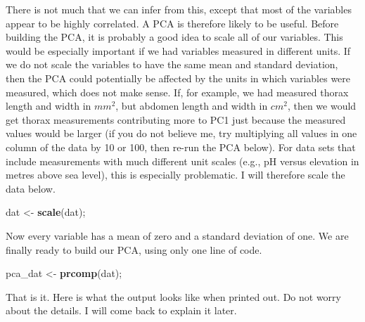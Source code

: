 \documentclass[]{article}
\newenvironment{Shaded}{\begin{snugshade}}{\end{snugshade}}
\newcommand{\KeywordTok}[1]{\textcolor[rgb]{0.13,0.29,0.53}{\textbf{#1}}}
\newcommand{\NormalTok}[1]{#1}
\newcommand{\StringTok}[1]{\textcolor[rgb]{0.31,0.60,0.02}{#1}}
\begin{document}
There is not much that we can infer from this, except that most of the
variables appear to be highly correlated. A PCA is therefore likely to
be useful. Before building the PCA, it is probably a good idea to scale
all of our variables. This would be especially important if we had
variables measured in different units. If we do not scale the variables
to have the same mean and standard deviation, then the PCA could
potentially be affected by the units in which variables were measured,
which does not make sense. If, for example, we had measured thorax
length and width in \(mm^2\), but abdomen length and width in
\(cm^{2}\), then we would get thorax measurements contributing more to
PC1 just because the measured values would be larger (if you do not
believe me, try multiplying all values in one column of the data by 10
or 100, then re-run the PCA below). For data sets that include
measurements with much different unit scales (e.g., pH versus elevation
in metres above sea level), this is especially problematic. I will
therefore scale the data below.

\begin{Shaded}
\begin{Highlighting}[]
\NormalTok{dat <-}\StringTok{ }\KeywordTok{scale}\NormalTok{(dat);}
\end{Highlighting}
\end{Shaded}

Now every variable has a mean of zero and a standard deviation of one.
We are finally ready to build our PCA, using only one line of code.

\begin{Shaded}
\begin{Highlighting}[]
\NormalTok{pca_dat <-}\StringTok{ }\KeywordTok{prcomp}\NormalTok{(dat);}
\end{Highlighting}
\end{Shaded}

That is it. Here is what the output looks like when printed out. Do not
worry about the details. I will come back to explain it later.
\end{document}
